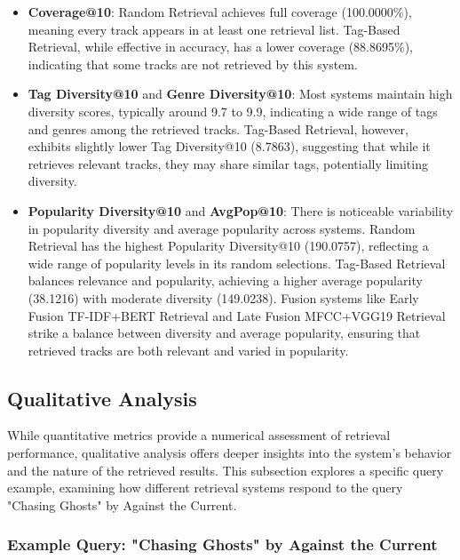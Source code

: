 \documentclass[sigconf]{acmart}
\begin{document}
\begin{itemize}
    \item \textbf{Coverage@10}: Random Retrieval achieves full coverage (100.0000\%), meaning every track appears in at least one retrieval list. Tag-Based Retrieval, while effective in accuracy, has a lower coverage (88.8695\%), indicating that some tracks are not retrieved by this system.

    \item \textbf{Tag Diversity@10} and \textbf{Genre Diversity@10}: Most systems maintain high diversity scores, typically around 9.7 to 9.9, indicating a wide range of tags and genres among the retrieved tracks. Tag-Based Retrieval, however, exhibits slightly lower Tag Diversity@10 (8.7863), suggesting that while it retrieves relevant tracks, they may share similar tags, potentially limiting diversity.

    \item \textbf{Popularity Diversity@10} and \textbf{AvgPop@10}: There is noticeable variability in popularity diversity and average popularity across systems. Random Retrieval has the highest Popularity Diversity@10 (190.0757), reflecting a wide range of popularity levels in its random selections. Tag-Based Retrieval balances relevance and popularity, achieving a higher average popularity (38.1216) with moderate diversity (149.0238). Fusion systems like Early Fusion TF-IDF+BERT Retrieval and Late Fusion MFCC+VGG19 Retrieval strike a balance between diversity and average popularity, ensuring that retrieved tracks are both relevant and varied in popularity.
\end{itemize}

\subsection{Qualitative Analysis}
\label{subsec:qualitative_analysis}

While quantitative metrics provide a numerical assessment of retrieval performance, qualitative analysis offers deeper insights into the system's behavior and the nature of the retrieved results. This subsection explores a specific query example, examining how different retrieval systems respond to the query "Chasing Ghosts" by Against the Current.

\subsubsection{Example Query: "Chasing Ghosts" by Against the Current}
\label{subsubsec:chasing_ghosts_analysis}
\end{document}
